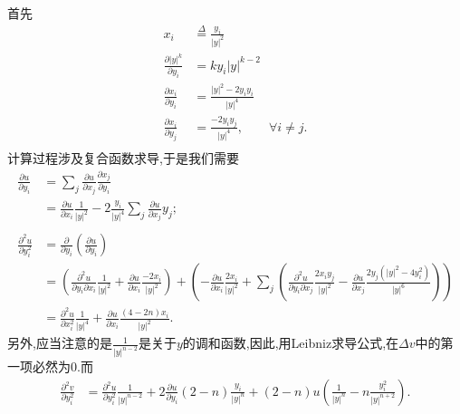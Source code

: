 \documentclass[12pt, a4paper]{ctexbook}
\begin{document}
    首先
    \begin{align*}
    x_i &\stackrel{\Delta}{=} \frac{y_i}{|y|^2}\\
    \frac{\partial |y|^k}{\partial y_i} &= k  y_i  |y|^{k-2}\\
    \frac{\partial x_i}{\partial y_i} &= \frac{|y|^2-2y_iy_i}{|y|^4}\\
    \frac{\partial x_i}{\partial y_j} &= \frac{-2y_iy_j}{|y|^4},\qquad \forall i\neq j.\\
    \end{align*}
    计算过程涉及复合函数求导,于是我们需要
    \begin{align*}
    \frac{\partial u}{\partial y_i} &= \sum_j \frac{\partial u}{\partial x_j}\frac{\partial x_j}{\partial y_i} \\
    &= \frac{\partial u}{\partial x_i}\frac1{|y|^2} - 2\frac{y_i}{|y|^4}\sum_j\frac{\partial u}{\partial x_j}y_j;\\
    & \\
    \frac{\partial^2 u}{\partial y_i^2} &= \frac{\partial}{\partial y_i} (\frac{\partial u}{\partial y_i}) \\
    &= (\frac{\partial^2 u}{\partial y_i \partial x_i} \frac1{|y|^2} + \frac{\partial u}{\partial x_i}\frac{-2x_i}{|y|^2}) + (- \frac{\partial u}{\partial x_i}\frac{2x_i}{|y|^2} + \sum_j (\frac{\partial^2 u}{\partial y_i \partial x_j}\frac{2x_iy_j}{|y|^2} - \frac{\partial u}{\partial x_j}\frac{2y_j(|y|^2-4y_i^2)}{|y|^6})) \\
    &= \frac{\partial^2u}{\partial x_i^2}\frac1{|y|^4} + \frac{\partial u}{\partial x_i}\frac{(4-2n)x_i}{|y|^2}.
    \end{align*}
    另外,应当注意的是$\frac{1}{|y|^{n-2}}$是关于$y$的调和函数,因此,用Leibniz求导公式,在$\Delta v$中的第一项必然为0.而
    \begin{align*}
    \frac{\partial^2v}{\partial y_i^2}
    &= \frac{\partial^2u}{\partial y_i^2}\frac1{|y|^{n-2}} + 2\frac{\partial u}{\partial y_i}(2-n)\frac{y_i}{|y|^n} +  (2-n) u  (\frac1{|y|^n} - n\frac{y_i^2}{|y|^{n+2}}).\\
    \end{align*}
\end{document}

